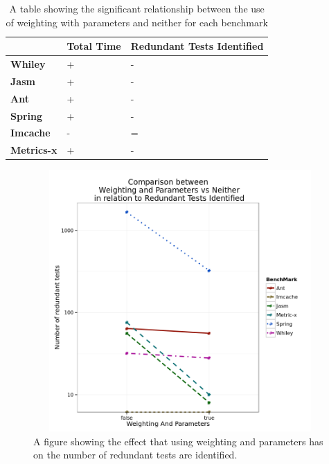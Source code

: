 \begin{table}[h]
\centering

\begin{tabular}{|l|l|l|}
\hline
{\bf }          & {\bf Total Time} & {\bf Redundant Tests Identified} \\ \hline
{\bf Whiley}    & +                & -                           \\ \hline
{\bf Jasm}      & +                & -                           \\ \hline
{\bf Ant}       & +                & -                           \\ \hline
{\bf Spring}    & +                & -                           \\ \hline
{\bf Imcache}   & -                & =                           \\ \hline
{\bf Metrics-x} & +                & -                           \\ \hline
\end{tabular}
\caption{A table showing the significant relationship between the use of weighting with parameters and neither for each benchmark}
\label{weightingparamsig}
\end{table}

\begin{figure}[h]
\begin{center}
\includegraphics[height=10cm, width = 14.5cm]{WeightNParam.png}
\end{center}
\caption{A figure showing the effect that using weighting and parameters has on the number of redundant tests are identified.}
\label{fig:weightingparamgraph}
\end{figure}

